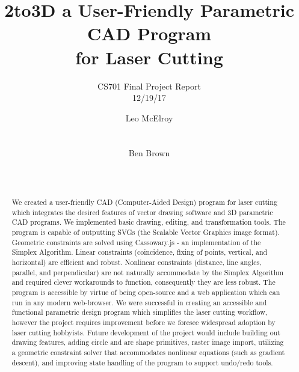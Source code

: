 \documentclass{sig-alternate-05-2015}
\begin{document}
\title{2to3D a User-Friendly Parametric CAD Program\\for Laser Cutting}
\subtitle{CS701 Final Project Report \\ 12/19/17}


\author{
%
\alignauthor
Leo McElroy\\
       \\
       \\
\alignauthor
Ben Brown\\
       \\
       \\
}

\maketitle

\begin{abstract}

We created a user-friendly CAD (Computer-Aided Design) program for laser cutting which integrates the desired features of vector drawing software and 3D parametric CAD programs. We implemented basic drawing, editing, and transformation tools. The program is capable of outputting SVGs (the Scalable Vector Graphics image format). Geometric constraints are solved using Cassowary.js - an implementation of the Simplex Algorithm. Linear constraints (coincidence, fixing of points, vertical, and horizontal) are efficient and robust. Nonlinear constraints (distance, line angles, parallel, and perpendicular) are not naturally accommodate by the Simplex Algorithm and required clever workarounds to function, consequently they are less robust. The program is accessible by virtue of being open-source and a web application which can run in any modern web-browser. We were successful in creating an accessible and functional parametric design program which simplifies the laser cutting workflow, however the project requires improvement before we foresee widespread adoption by laser cutting hobbyists. Future development of the project would include building out drawing features, adding circle and arc shape primitives, raster image import, utilizing a geometric constraint solver that accommodates nonlinear equations (such as gradient descent), and improving state handling of the program to support undo/redo tools.

\end{abstract}
\end{document}
